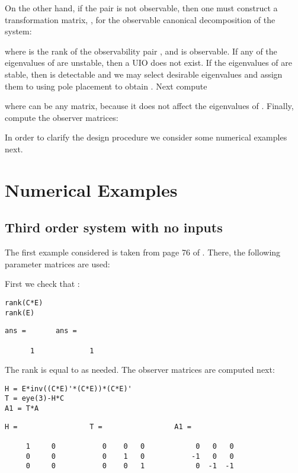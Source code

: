 \documentclass{amsart}
\theoremstyle{definition}
\theoremstyle{remark}
\numberwithin{equation}{section}
\begin{document}
On the other hand, if the pair  is not observable, then one must construct a transformation matrix, , for the observable canonical decomposition of the system:



where  is the rank of the observability pair , and  is observable. If any of the eigenvalues of  are unstable, then a UIO does not exist. If the eigenvalues of  are stable, then  is detectable and we may select  desirable eigenvalues and assign them to  using pole placement to obtain . Next compute 

 

where  can be any  matrix, because it does not affect the eigenvalues of . Finally, compute the observer matrices:


In order to clarify the design procedure we consider some numerical examples next.
\section{Numerical Examples} 
\subsection{Third order system with no inputs}\label{ex:ex1}
The first example considered is taken from page 76 of \cite{Chen99}. There, the following parameter matrices are used: 



\begin{par}
\noindent First we check that :
\end{par} 
\begin{verbatim}
rank(C*E)
rank(E)
\end{verbatim}

        \color{lightgray} \begin{verbatim}
ans =       ans =

      1             1
\end{verbatim} \color{black}

\begin{par}
The rank is equal to  as needed. The observer matrices are computed next:
\end{par}



\begin{verbatim}
H = E*inv((C*E)'*(C*E))*(C*E)'
T = eye(3)-H*C
A1 = T*A
\end{verbatim}
        \color{lightgray} \begin{verbatim}
H =                 T =                 A1 =

     1     0           0    0   0            0   0   0
     0     0           0    1   0           -1   0   0
     0     0           0    0   1            0  -1  -1

\end{verbatim} \color{black}
\end{document}
